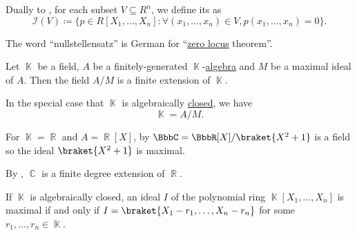 \begin{definition}\label{def:ideal_of_affine_variety}
  Dually to , for each subset \( V \subseteq R^n \), we define its  as
  \begin{equation*}
    \mathcal{I}(V) \coloneqq \{ p \in R[X_1, \ldots, X_n] \colon \forall (x_1, \ldots, x_n) \in V, p(x_1, \ldots, x_n) = 0 \}.
  \end{equation*}
\end{definition}

\begin{remark}\label{rem:nullstelletsatz_etymology}
  The word \enquote{nullstellensatz} is German for \enquote{\hyperref[def:zero_locus]{zero locus} theorem}.
\end{remark}

\begin{theorem}\label{thm:algebraic_nullstellensatz}
  Let \( \BbbK \) be a field, \( A \) be a finitely-generated \( \BbbK \)-\hyperref[def:algebra_over_ring]{algebra} and \( M \) be a maximal ideal of \( A \). Then the field \( A / M \) is a finite extension of \( \BbbK \).

  In the special case that \( \BbbK \) is algebraically \hyperref[def:algebraically_closed_field]{closed}, we have
  \begin{equation*}
    \BbbK = A / M.
  \end{equation*}
\end{theorem}

\begin{example}\label{ex:algebraic_nullstellensatz_real_over_complex}
  For \( \BbbK = \BbbR \) and \( A = \BbbR[X] \), by  \( \BbbC = \BbbR[X] / \braket{X^2 + 1} \) is a field so the ideal \( \braket{X^2 + 1} \) is maximal.

  By , \( \BbbC \) is a finite degree extension of \( \BbbR \).
\end{example}

\begin{corollary}\label{thm:closed_field_maximal_ideal_representation}
  If \( \BbbK \) is algebraically closed, an ideal \( I \) of the polynomial ring \( \BbbK[X_1, \ldots, X_n] \) is maximal if and only if \( I = \braket{X_1 - r_1, \ldots, X_n - r_n} \) for some \( r_1, \ldots, r_n \in \BbbK \).
\end{corollary}

